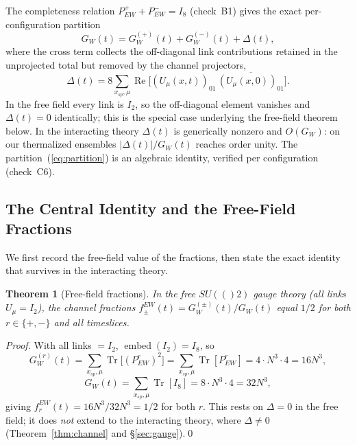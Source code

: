 \documentclass[12pt,a4paper]{article}
\newtheorem{theorem}{Theorem}[section]
\newcommand{\SU}{\mathrm{SU}}
\renewcommand{\Re}{\operatorname{Re}}
\newcommand{\Tr}{\operatorname{Tr}}
\newcommand{\embed}{\operatorname{embed}}
\newcommand{\Id}[1]{I_{#1}}
\newcommand{\Pew}[1]{P^{#1}_{\mathrm{EW}}}
\newcommand{\GW}[1]{G_W^{(#1)}}
\newcommand{\fEW}[1]{f_{#1}^{\mathrm{EW}}}
\def\SU#1{SU(#1)}%
\def\mathrm#1{#1}%
\begin{document}
	The completeness relation $\Pew{+}+\Pew{-}=\Id{8}$ (check~B1) gives the exact
	per-configuration partition
	\begin{equation}\label{eq:partition}
		G_W(t) = \GW{+}(t)+\GW{-}(t)+\Delta(t),
	\end{equation}
	where the cross term collects the off-diagonal link contributions retained in the
	unprojected total but removed by the channel projectors,
	\begin{equation}\label{eq:crossdef}
		\Delta(t) = 8\sum_{x_{\mathrm{sp}},\mu}\Re\!\bigl[(U_\mu(x,t))_{01}\,
		\overline{(U_\mu(x,0))_{01}}\bigr].
	\end{equation}
	In the free field every link is $I_2$, so the off-diagonal element vanishes and
	$\Delta(t)=0$ identically; this is the special case underlying the free-field
	theorem below.  In the interacting theory $\Delta(t)$ is generically nonzero and
	$O(G_W)$: on our thermalized ensembles $|\Delta(t)|/G_W(t)$ reaches order unity.
	The partition~(\ref{eq:partition}) is an algebraic identity, verified per
	configuration (check~C6).
	
	\subsection{The Central Identity and the Free-Field Fractions}
	
	We first record the free-field value of the fractions, then state the exact
	identity that survives in the interacting theory.
	
	\begin{theorem}[Free-field fractions]\label{thm:freefield}
		In the free $\SU(2)$ gauge theory (all links $U_\mu=I_2$), the channel fractions
		$\fEW{\pm}(t)=\GW{\pm}(t)/G_W(t)$ equal $1/2$ for both $r\in\{+,-\}$ and all
		timeslices.
	\end{theorem}
	
	\begin{proof}
		With all links $=I_2$, $\embed(I_2)=\Id{8}$, so
		\[
		\GW{r}(t)
		= \sum_{x_{\mathrm{sp}},\mu}\Tr\!\bigl[(\Pew{r})^2\bigr]
		= \sum_{x_{\mathrm{sp}},\mu}\Tr[\Pew{r}]
		= 4\cdot N^3\cdot 4 = 16N^3,
		\]
		\[
		G_W(t) = \sum_{x_{\mathrm{sp}},\mu}\Tr[\Id{8}] = 8\cdot N^3\cdot 4 = 32N^3,
		\]
		giving $\fEW{r}(t)=16N^3/32N^3=1/2$ for both $r$.  This rests on $\Delta=0$ in
		the free field; it does \emph{not} extend to the interacting theory, where
		$\Delta\neq0$ (Theorem~\ref{thm:channel} and \S\ref{sec:gauge}).\qed
	\end{proof}
	
\end{document}
